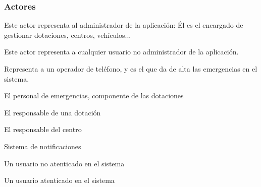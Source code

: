 \subsubsection{Actores}

{\reportauthors}
{}
{Este actor representa al administrador de la aplicación: Él es el encargado de gestionar dotaciones, centros, vehículos...}

{\reportauthors}
{}
{Este actor representa a cualquier usuario no administrador de la aplicación.}

{\reportauthors}
{}
{Representa a un operador de teléfono, y es el que da de alta las emergencias en el sistema.}

{\reportauthors}
{}
{El personal de emergencias, componente de las dotaciones}

{\reportauthors}
{}
{El responsable de una dotación}

{\reportauthors}
{}
{El responsable del centro}

{\reportauthors}
{}
{Sistema de notificaciones}

{\reportauthors}
{}
{Un usuario no atenticado en el sistema}

{\reportauthors}
{}
{Un usuario atenticado en el sistema}


